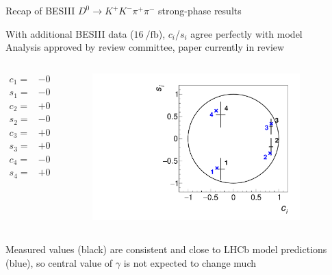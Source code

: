 \documentclass{beamer}
\begin{document}
\begin{frame}{Recap of BESIII $D^0\to K^+K^-\pi^+\pi^-$ strong-phase results}
  \begin{center}
    With additional BESIII data ($\SI{16}{\per\femto\barn}$), $c_i$/$s_i$ agree perfectly with model \\
    Analysis approved by review committee, paper currently in review
  \end{center}
  \vspace{-0.3cm}
  \begin{columns}
    \begin{column}{0.5\textwidth}
      \vspace{-0.5cm}
      \begin{align*}
        c_1 =& -0.28 \pm 0.09 \pm 0.01 \\
        s_1 =& -0.68 \pm 0.24 \pm 0.04 \\
        c_2 =& +0.83 \pm 0.04 \pm 0.01 \\
        s_2 =& -0.18 \pm 0.19 \pm 0.03 \\
        c_3 =& +0.83 \pm 0.03 \pm 0.01 \\
        s_3 =& +0.27 \pm 0.17 \pm 0.03 \\
        c_4 =& -0.28 \pm 0.10 \pm 0.01 \\
        s_4 =& +0.54 \pm 0.28 \pm 0.04
      \end{align*}
    \end{column}
    \begin{column}{0.5\textwidth}
      \begin{figure}
        \centering
        \includegraphics[width=0.9\textwidth]{Plots/cisi_FitResults_Model.pdf}
      \end{figure}
    \end{column}
  \end{columns}
  \begin{center}
    Measured values (black) are consistent and close to LHCb model predictions (blue), so central value of $\gamma$ is not expected to change much
  \end{center}
\end{frame}
\end{document}
